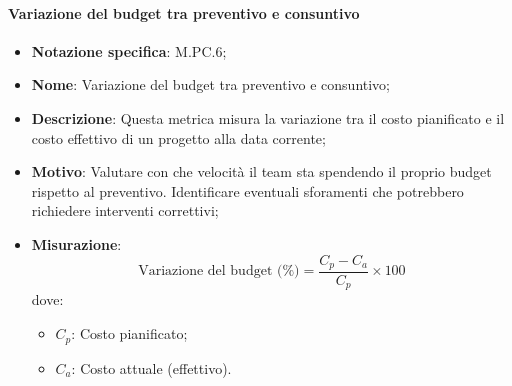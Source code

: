 \paragraph*{Variazione del budget tra preventivo e consuntivo}
\begin{itemize}
    \item \textbf{Notazione specifica}: M.PC.6;
    \item \textbf{Nome}: Variazione del budget tra preventivo e consuntivo;
    \item \textbf{Descrizione}: Questa metrica misura la variazione tra il costo pianificato e il costo effettivo di un progetto alla data corrente;
    \item \textbf{Motivo}: Valutare con che velocità il team sta spendendo il proprio budget rispetto al preventivo. Identificare eventuali sforamenti che potrebbero richiedere interventi correttivi;
    \item \textbf{Misurazione}:
    \[
        \text{Variazione del budget (\%)} = \frac{C_p - C_a}{C_p} \times 100
    \]
    dove:
    \begin{itemize}
        \item $C_{p}$: Costo pianificato;
        \item $C_{a}$: Costo attuale (effettivo).
    \end{itemize}
\end{itemize}
